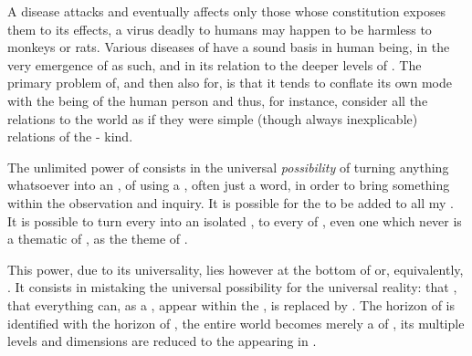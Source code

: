 \pan A disease attacks and eventually affects only those whose constitution
exposes them to its effects, a virus deadly to humans may happen to be harmless
to monkeys or rats.  Various diseases of  have a sound basis in
human being, in the very emergence of  as such, and in its
relation to the deeper levels of .
The primary problem of, and then also for,
 is that it tends to conflate its own mode with the being
of the human person and thus, for instance, consider all the relations to
the world as if they were simple (though  always inexplicable)
relations of the - kind.


\pa The unlimited power of  consists in the universal {\em
  possibility} of turning anything whatsoever into an , of using a
, often just a word, in order to bring something within the  observation and inquiry. It is possible for the  to be added to all my . It is possible to turn every  into an isolated
, to  every  of , even 
  one which never is a thematic  of , as the
   theme of . 

This power, due to its universality, lies however at the bottom of
 or, equivalently, .  It consists in mistaking the universal
possibility for the universal reality: that , that everything can, as a , appear within the \hoa, is
replaced by . The horizon of
 is identified with the horizon of , the entire
world becomes merely a  of , its multiple levels and
dimensions are reduced to the  appearing in . 


